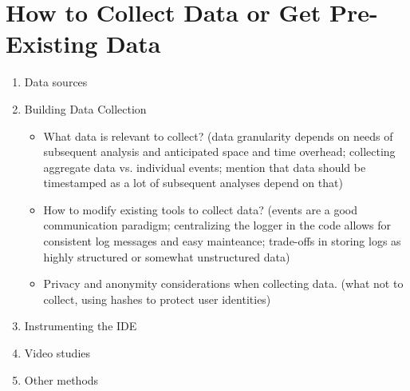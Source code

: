\section{How to Collect Data or Get Pre-Existing Data}


  \begin{enumerate}
  \item Data sources

  \item Building Data Collection %
  
    \begin{itemize}
    \item
      What data is relevant to collect? (data granularity depends on needs of subsequent analysis and anticipated space and time overhead; collecting aggregate data vs. individual events; mention that data should be timestamped as a lot of subsequent analyses depend on that)
    \item
      How to modify existing tools to collect data? (events are a good communication paradigm; centralizing the logger in the code allows for consistent log messages and easy mainteance; trade-offs in storing logs as highly structured or somewhat unstructured data)
    \item
      Privacy and anonymity considerations when collecting data. (what not to collect, using hashes to protect user identities)
    \end{itemize}

  \item Instrumenting the IDE %

  \item Video studies %

  \item Other methods

  \end{enumerate}

